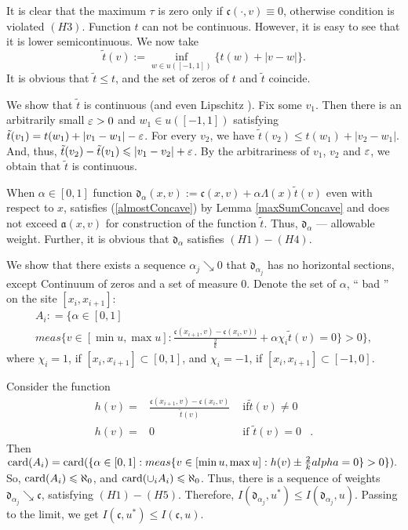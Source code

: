 It is clear that the maximum $\tau$ is zero only if $\mathfrak c(\cdot, v) \equiv 0$, otherwise condition is violated
$(H3)$.
Function $t$ can not be continuous. However, it is easy to see that it is lower semicontinuous.
We now take
$$\tilde{t}(v) := \inf_{w \in u([-1, 1])} \{t(w) + |v - w|\}.$$
It is obvious that $\tilde{t} \le t$, and the set of zeros of $t$ and $\tilde{t}$ coincide.

We show that $\tilde{t}$ is continuous (and even Lipschitz ).
Fix some $v_1$.
Then there is an arbitrarily small $\varepsilon > 0$ and $w_1 \in u([-1, 1])$
satisfying $\tilde{t}(v_1) = t(w_1) + |v_1 - w_1| - \varepsilon$.
For every $v_2$, we have $\tilde{t}(v_2) \le t(w_1) + |v_2 - w_1|$.
And, thus, $\tilde{t}(v_2) - \tilde{t}(v_1) \leqslant |v_1 - v_2| + \varepsilon$.
By the arbitrariness of $v_1$, $v_2$ and $\varepsilon$, we obtain that $\tilde{t}$ is continuous.

When $\alpha \in [0, 1]$ function $\mathfrak d_\alpha(x, v) := \mathfrak c(x, v) + \alpha \Lambda(x) \tilde{t}(v)$
even with respect to $x$, satisfies (\ref{almostConcave}) by Lemma \ref{maxSumConcave}
and does not exceed $\mathfrak a(x, v)$ for construction of the function $\tilde{t}$.
Thus, $\mathfrak d_\alpha$ --- allowable weight.
Further, it is obvious that $\mathfrak d_\alpha$ satisfies $(H1)-(H4)$.

We show that there exists a sequence $\alpha_j \searrow 0$
that $\mathfrak d_{\alpha_j}$ has no horizontal sections, except
Continuum of zeros and a set of measure $0$.
Denote the set of $\alpha$, `` bad '' on the site $[x_i, x_{i + 1}]$:
\begin{multline*}
A_i: = \big \{\alpha \in [ 0, 1 ] \\
meas \{v \in [\min u, \max u]: \frac{\mathfrak c (x_{i + 1}, v) - \mathfrak c (x_i, v))}{\frac{2}{k}} + \alpha \chi_i \tilde{t} (v) = 0 \} > 0 \big \},
\end{multline*}
where $\chi_i = 1$, if $[x_i, x_{i + 1}] \subset [0, 1]$, and $\chi_i = -1$, if $[x_i, x_{i + 1}] \subset [-1, 0]$.

Consider the function
$$
\begin{aligned}
h (v) = & \frac{\mathfrak c (x_{i + 1}, v) - \mathfrak c (x_i, v)}{\tilde{t} (v)} & \text{ if} \tilde{t} ( v) \neq 0 & \\
h (v) = & 0 & \text{ if } \tilde{t} (v) = 0 &.
\end{aligned}
$$
Then $\card(A_i) = \card(\{ \alpha \in [0, 1]: meas \{ v \in [\min u, \max u]: h(v) \pm \frac{2}{k}\\alpha = 0 \} > 0 \}).$
So, ${\rm card}(A_i) \leqslant \aleph_0$, and ${\rm card}(\cup_i A_i) \leqslant \aleph_0$.
Thus, there is a sequence of weights $\mathfrak d_{\alpha_j} \searrow \mathfrak c$, satisfying $(H1)-(H5)$.
Therefore, $I(\mathfrak d_{\alpha_j}, u^*) \le I(\mathfrak d_{\alpha_j}, u)$.
Passing to the limit, we get $I(\mathfrak c, u^*) \le I(\mathfrak c, u)$.

